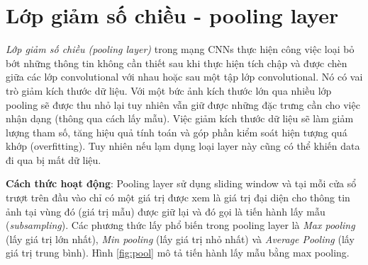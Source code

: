 \section{Lớp giảm số chiều -  pooling layer}
\hspace{5mm} \textit{Lớp giảm số chiều (pooling layer)} trong mạng CNNs thực hiện công việc loại bỏ bớt những thông tin không cần thiết sau khi thực hiện tích chập và được chèn giữa các lớp convolutional với nhau hoặc sau một tập lớp convolutional. Nó có vai trò giảm kích thước dữ liệu. Với một bức ảnh kích thước lớn qua nhiều lớp pooling sẽ được thu nhỏ lại tuy nhiên vẫn giữ được những đặc trưng cần cho việc nhận dạng (thông qua cách lấy mẫu). Việc giảm kích thước dữ liệu sẽ làm giảm lượng tham số, tăng hiệu quả tính toán và góp phần kiểm soát hiện tượng quá khớp (overfitting). Tuy nhiên nếu lạm dụng loại layer này cũng có thể khiến data đi qua bị mất dữ liệu.\par
\textbf{Cách thức hoạt động}: Pooling layer sử dụng sliding window và tại mỗi cửa sổ trượt trên đầu vào chỉ có một giá trị được xem là giá trị đại diện cho thông tin ảnh tại vùng đó (giá trị mẫu) được giữ lại và đó gọi là tiến hành lấy mẫu (\textit{subsampling}). Các phương thức lấy phổ biến trong pooling layer là \textit{Max pooling} (lấy giá trị lớn nhất), \textit{Min pooling} (lấy giá trị nhỏ nhất) và \textit{Average Pooling} (lấy giá trị trung bình). Hình \ref{fig:pool} mô tả tiến hành lấy mẫu bằng max pooling.

